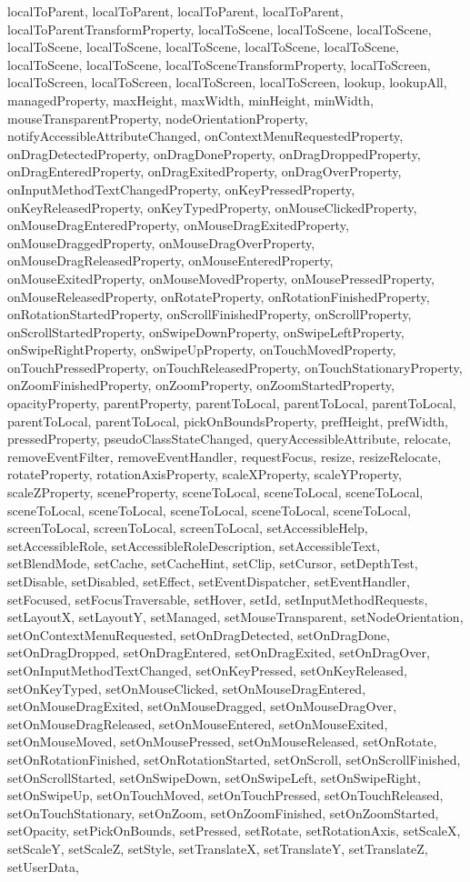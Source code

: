 {{{{{{{{{{{{{{{{{{{{{{{{{{{{{{{{{{{{{{{{{{{{{{{{{{{{{{{localToParent, localToParent, localToParent, localToParent, localToParentTransformProperty, localToScene, localToScene, localToScene, localToScene, localToScene, localToScene, localToScene, localToScene, localToScene, localToScene, localToSceneTransformProperty, localToScreen, localToScreen, localToScreen, localToScreen, localToScreen, lookup, lookupAll, managedProperty, maxHeight, maxWidth, minHeight, minWidth, mouseTransparentProperty, nodeOrientationProperty, notifyAccessibleAttributeChanged, onContextMenuRequestedProperty, onDragDetectedProperty, onDragDoneProperty, onDragDroppedProperty, onDragEnteredProperty, onDragExitedProperty, onDragOverProperty, onInputMethodTextChangedProperty, onKeyPressedProperty, onKeyReleasedProperty, onKeyTypedProperty, onMouseClickedProperty, onMouseDragEnteredProperty, onMouseDragExitedProperty, onMouseDraggedProperty, onMouseDragOverProperty, onMouseDragReleasedProperty, onMouseEnteredProperty, onMouseExitedProperty, onMouseMovedProperty, onMousePressedProperty, onMouseReleasedProperty, onRotateProperty, onRotationFinishedProperty, onRotationStartedProperty, onScrollFinishedProperty, onScrollProperty, onScrollStartedProperty, onSwipeDownProperty, onSwipeLeftProperty, onSwipeRightProperty, onSwipeUpProperty, onTouchMovedProperty, onTouchPressedProperty, onTouchReleasedProperty, onTouchStationaryProperty, onZoomFinishedProperty, onZoomProperty, onZoomStartedProperty, opacityProperty, parentProperty, parentToLocal, parentToLocal, parentToLocal, parentToLocal, parentToLocal, pickOnBoundsProperty, prefHeight, prefWidth, pressedProperty, pseudoClassStateChanged, queryAccessibleAttribute, relocate, removeEventFilter, removeEventHandler, requestFocus, resize, resizeRelocate, rotateProperty, rotationAxisProperty, scaleXProperty, scaleYProperty, scaleZProperty, sceneProperty, sceneToLocal, sceneToLocal, sceneToLocal, sceneToLocal, sceneToLocal, sceneToLocal, sceneToLocal, sceneToLocal, screenToLocal, screenToLocal, screenToLocal, setAccessibleHelp, setAccessibleRole, setAccessibleRoleDescription, setAccessibleText, setBlendMode, setCache, setCacheHint, setClip, setCursor, setDepthTest, setDisable, setDisabled, setEffect, setEventDispatcher, setEventHandler, setFocused, setFocusTraversable, setHover, setId, setInputMethodRequests, setLayoutX, setLayoutY, setManaged, setMouseTransparent, setNodeOrientation, setOnContextMenuRequested, setOnDragDetected, setOnDragDone, setOnDragDropped, setOnDragEntered, setOnDragExited, setOnDragOver, setOnInputMethodTextChanged, setOnKeyPressed, setOnKeyReleased, setOnKeyTyped, setOnMouseClicked, setOnMouseDragEntered, setOnMouseDragExited, setOnMouseDragged, setOnMouseDragOver, setOnMouseDragReleased, setOnMouseEntered, setOnMouseExited, setOnMouseMoved, setOnMousePressed, setOnMouseReleased, setOnRotate, setOnRotationFinished, setOnRotationStarted, setOnScroll, setOnScrollFinished, setOnScrollStarted, setOnSwipeDown, setOnSwipeLeft, setOnSwipeRight, setOnSwipeUp, setOnTouchMoved, setOnTouchPressed, setOnTouchReleased, setOnTouchStationary, setOnZoom, setOnZoomFinished, setOnZoomStarted, setOpacity, setPickOnBounds, setPressed, setRotate, setRotationAxis, setScaleX, setScaleY, setScaleZ, setStyle, setTranslateX, setTranslateY, setTranslateZ, setUserData, }}}}}}}}}}}}}}}}}}}}}}}}}}}}}}}}}}}}}}}}}}}}}}}}}}}}}}}
